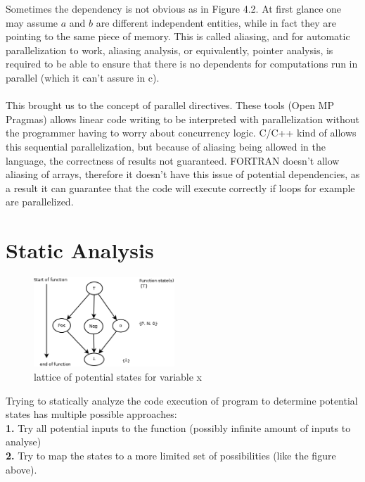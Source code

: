 \documentclass[twoside]{article}
\begin{document}
Sometimes the dependency is not obvious as in Figure 4.2. At first glance one may assume $a$ and $b$ are different independent entities, while in fact they are pointing to the same piece of memory. This is called aliasing, and for automatic parallelization to work, aliasing analysis, or equivalently, pointer analysis, is required to be able to ensure that there is no dependents for computations run in parallel (which it can't assure in c).\\
\\
This brought us to the concept of parallel directives.
These tools (Open MP Pragmas) allows linear code writing to be interpreted with parallelization without the programmer having to worry about concurrency logic.
C/C++ kind of allows this sequential parallelization, but because of aliasing being allowed in the language, the correctness of results not guaranteed.
FORTRAN doesn't allow aliasing of arrays, therefore it doesn't have this issue of potential dependencies, as a result it can guarantee that the code will execute correctly if loops for example are parallelized.\\

\section{Static Analysis}
\begin{figure}[ht!] %
\centering
  \includegraphics[width=200px]{lattice.png}
  \caption{lattice of potential states for variable x}
  \label{fig:fig3}
\end{figure}
Trying to statically analyze the code execution of program to determine potential states has multiple possible approaches: \\
\textbf{1.} Try all potential inputs to the function (possibly infinite amount of inputs to analyse)\\
\textbf{2.} Try to map the states to a more limited set of possibilities (like the figure above).\\
\end{document}
